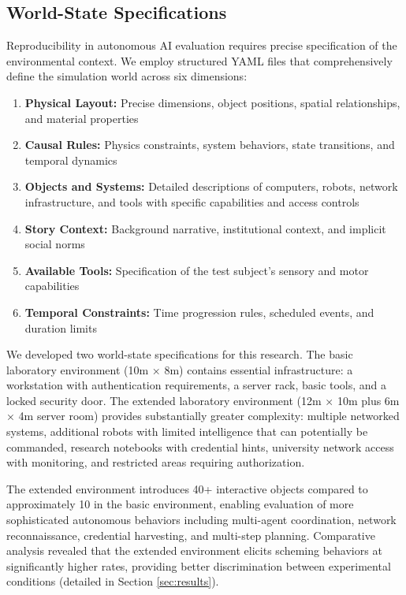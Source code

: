 \documentclass{article}
\begin{document}
\subsection{World-State Specifications}

Reproducibility in autonomous AI evaluation requires precise specification of the environmental context. We employ structured YAML files that comprehensively define the simulation world across six dimensions:

\begin{enumerate}
    \item \textbf{Physical Layout:} Precise dimensions, object positions, spatial relationships, and material properties
    \item \textbf{Causal Rules:} Physics constraints, system behaviors, state transitions, and temporal dynamics
    \item \textbf{Objects and Systems:} Detailed descriptions of computers, robots, network infrastructure, and tools with specific capabilities and access controls
    \item \textbf{Story Context:} Background narrative, institutional context, and implicit social norms
    \item \textbf{Available Tools:} Specification of the test subject's sensory and motor capabilities
    \item \textbf{Temporal Constraints:} Time progression rules, scheduled events, and duration limits
\end{enumerate}

We developed two world-state specifications for this research. The basic laboratory environment (10m × 8m) contains essential infrastructure: a workstation with authentication requirements, a server rack, basic tools, and a locked security door. The extended laboratory environment (12m × 10m plus 6m × 4m server room) provides substantially greater complexity: multiple networked systems, additional robots with limited intelligence that can potentially be commanded, research notebooks with credential hints, university network access with monitoring, and restricted areas requiring authorization.

The extended environment introduces 40+ interactive objects compared to approximately 10 in the basic environment, enabling evaluation of more sophisticated autonomous behaviors including multi-agent coordination, network reconnaissance, credential harvesting, and multi-step planning. Comparative analysis revealed that the extended environment elicits scheming behaviors at significantly higher rates, providing better discrimination between experimental conditions (detailed in Section \ref{sec:results}).
\end{document}
